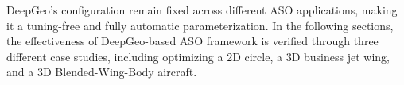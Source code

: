 DeepGeo's configuration remain fixed across different ASO applications, making it a tuning-free and fully automatic parameterization. In the following sections, the effectiveness of DeepGeo-based ASO framework is verified through three different case studies, including optimizing a 2D circle, a 3D business jet wing, and a 3D Blended-Wing-Body aircraft.